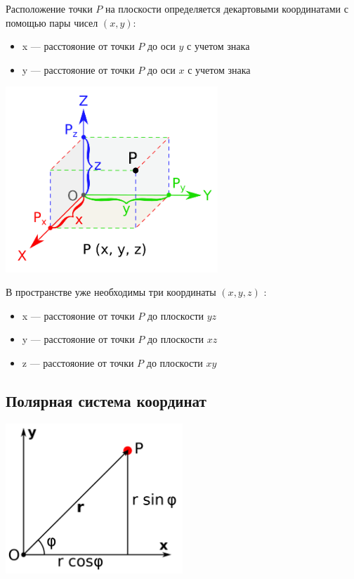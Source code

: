 \documentclass[12pt, fleqn]{extarticle}
\begin{document}
Расположение точки \(P\) на плоскости определяется декартовыми координатами с помощью пары чисел \((x, y)\):
\begin{itemize}
    \item {x — расстояоние от точки \(P\) до оси \(y\) с учетом знака}
    \item {y — расстояоние от точки \(P\) до оси \(x\) с учетом знака}
\end{itemize}

\begin{center}
    \includegraphics[width=0.6\textwidth]{cartesian_system.png}
\end{center}

В пространстве уже необходимы три координаты \((x, y, z)\) :
\begin{itemize}
    \item {x — расстояоние от точки \(P\) до плоскости \(yz\)}
    \item {y — расстояоние от точки \(P\) до плоскости \(xz\)}
    \item {z — расстояоние от точки \(P\) до плоскости \(xy\)}
\end{itemize}


\subsection*{Полярная система координат}

\begin{center}
    \includegraphics[width=0.5\textwidth]{polar_system.png}
\end{center}
\end{document}
